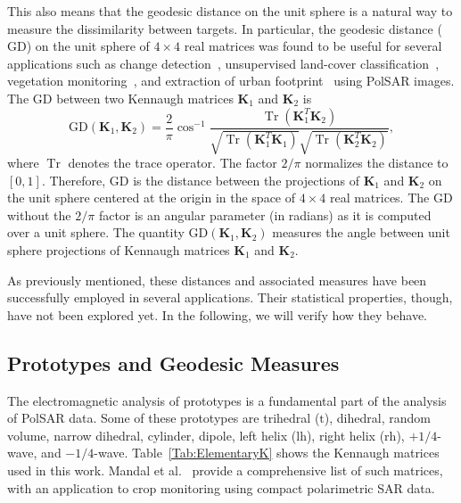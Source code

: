 \documentclass[journal]{IEEEtran}
\DeclareMathOperator{\Tr}{Tr}
\begin{document}
This also means that the geodesic distance on the unit sphere is a natural way to measure the dissimilarity between targets. 
In particular, the geodesic distance ($\text{GD}$) on the unit sphere of $4 \times 4$ real matrices was found to be useful for several applications such as change detection~\cite{ChangeDetectionPolSARGeodesicDistanceBetweenScatteringMechanisms}, 
unsupervised land-cover classification~\cite{ClassificationPolSARGeodesic}, 
vegetation monitoring~\cite{AGeneralizedVolumeScatteringModelBasedVegetationIndexfromPolarimetricSARData2019}, and 
extraction of urban footprint~\cite{NovelTechniquesforBuiltupAreaExtractionfromPolarimetricSARImages2019} using PolSAR images. 
The $\text{GD}$ between two Kennaugh matrices $\bm{K}_1$ and $\bm{K}_2$ is
\begin{equation}
\text{GD}(\bm{K}_1,\bm{K}_2) =  \frac{2}{\pi} \cos^{-1}\frac{\Tr(\bm{K}_1^T\bm{K}_2)}{\sqrt{\Tr(\bm{K}_1^T\bm{K}_1)}\sqrt{\Tr(\bm{K}_2^T\bm{K}_2)}} ,
\label{eq:GD_Ken}
\end{equation}
where $\Tr$ denotes the trace operator. 
The factor $2/\pi$ normalizes the distance to $[0,1]$. 
Therefore, $\text{GD}$ is the distance between the projections of $\bm{K}_1$ and $\bm{K}_2$ on the unit sphere centered at the origin in the space of $4 \times 4$ real matrices. 
The $\text{GD}$ without the $2/\pi$ factor is an angular parameter (in radians) as it is computed over a unit sphere. 
The quantity $\text{GD}(\bm{K}_1, \bm{K}_2)$ measures the angle between unit sphere projections of Kennaugh matrices $\bm{K}_1$ and  $\bm{K}_2$.

As previously mentioned, these distances and associated measures have been successfully employed in several applications.
Their statistical properties, though, have not been explored yet.
In the following, we will verify how they behave.

\subsection{Prototypes and Geodesic Measures}

The electromagnetic analysis of prototypes is a fundamental part of the analysis of PolSAR data.
Some of these prototypes are
{trihedral} ($\text{t}$), 
{dihedral}, 
{random volume}, 
{narrow dihedral}, 
{cylinder}, 
{dipole}, 
{left helix} ($\text{lh}$), 
{right helix} ($\text{rh}$), 
{$+1/4$-wave}, 
and {$-1/4$-wave}.
Table~\ref{Tab:ElementaryK} shows the Kennaugh matrices used in this work.
Mandal et al.~\cite{ARadarVegetationIndexforCropMonitoringUsingCompactPolarimetricSARData} provide a comprehensive list of such matrices, with an application to crop monitoring using compact polarimetric SAR data.
\end{document}
